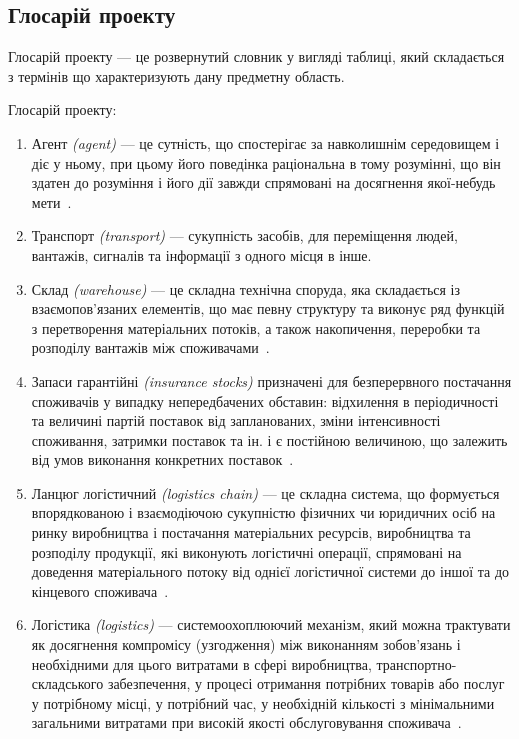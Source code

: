 \subsection{Глосарій проекту}
Глосарій проекту --- це розвернутий словник у вигляді таблиці, який складається з термінів що характеризують дану предметну область.

Глосарій проекту:
\begin{enumerate}
    \item Агент \textit{(agent)} --- це сутність, що спостерігає за навколишнім середовищем і діє у ньому, при цьому його поведінка раціональна в тому розумінні, що він здатен до розуміння і його дії завжди спрямовані на досягнення якої-небудь мети~\cite{Jennings1998}.
    \item Транспорт \textit{(transport)} --- сукупність засобів, для переміщення людей, вантажів, сигналів та інформації з одного місця в інше.
    \item Склад \textit{(warehouse)} --- це складна технічна споруда, яка складається із взаємопов'язаних елементів, що має певну структуру та виконує ряд функцій з перетворення матеріальних потоків, а також накопичення, переробки та розподілу вантажів між споживачами~\cite{Kusluy2010}. 
	\item Запаси гарантійні \textit{(insurance stocks)} призначені для безперервного постачання споживачів у випадку непередбачених обставин: відхилення в періодичності та величині партій поставок від запланованих, зміни інтенсивності споживання, затримки поставок та ін. і є постійною величиною, що залежить від умов виконання конкретних поставок~\cite{Kusluy2010}. 
	\item Ланцюг логістичний \textit{(logistics chain)}  --- це складна система, що формується впорядкованою і взаємодіючою сукупністю фізичних чи юридичних осіб на ринку виробництва і постачання матеріальних ресурсів, виробництва та розподілу продукції, які виконують логістичні операції, спрямовані на доведення матеріального потоку від однієї логістичної системи до іншої та до кінцевого споживача~\cite{Kusluy2010}.  
    \item Логістика \textit{(logistics)} --- системоохоплюючий механізм, який можна трактувати як досягнення компромісу (узгодження) між виконанням зобов’язань і необхідними для цього витратами в сфері виробництва, транспортно-складського забезпечення, у процесі отримання потрібних товарів або послуг у потрібному місці, у потрібний час, у необхідній кількості з мінімальними загальними витратами при високій якості обслуговування споживача~\cite{Kusluy2010}.

\end{enumerate}

